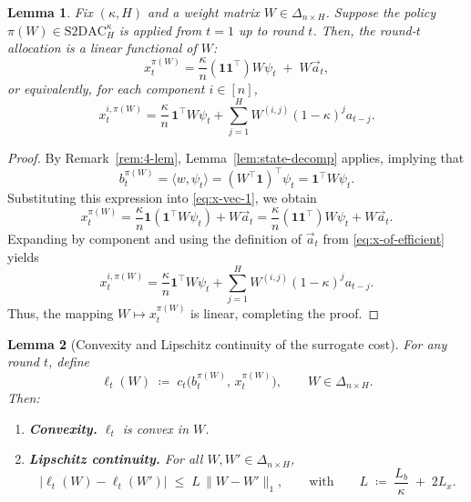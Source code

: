 \documentclass[11pt]{article}
\newtheorem{Thm:Lemma}{Lemma}
\begin{document}
\begin{Thm:Lemma}\label{lem:prefix-linear-x}
Fix \((\kappa, H)\) and a weight matrix \( W \in \Delta_{n \times H} \).  
Suppose the policy \( \pi(W) \in \mathrm{S2DAC}_H^\kappa \) is applied from \( t = 1 \) up to round \( t \).  
Then, the round-\(t\) allocation is a linear functional of \( W \):
\[
x_t^{\pi(W)} 
=
\frac{\kappa}{n} (\mathbf{1}\mathbf{1}^\top) W \psi_t 
\;+\;
W \vec{a}_t,
\]
or equivalently, for each component \( i \in [n] \),
\[
x_t^{i,\pi(W)} 
=
\frac{\kappa}{n}\,
\mathbf{1}^\top W \psi_t
+
\sum_{j=1}^H W^{(i,j)} (1-\kappa)^j a_{t-j}.
\]
\end{Thm:Lemma}

\begin{proof}
By Remark~\ref{rem:4-lem}, Lemma~\ref{lem:state-decomp} applies, implying that
\[
b_t^{\pi(W)}
= \langle w, \psi_t \rangle
= (W^\top \mathbf{1})^\top \psi_t
= \mathbf{1}^\top W \psi_t.
\]
Substituting this expression into \eqref{eq:x-vec-1}, we obtain
\[
x_t^{\pi(W)} 
= \frac{\kappa}{n} \mathbf{1} (\mathbf{1}^\top W \psi_t) + W \vec{a}_t
= \frac{\kappa}{n} (\mathbf{1}\mathbf{1}^\top) W \psi_t + W \vec{a}_t.
\]
Expanding by component and using the definition of \(\vec{a}_t\) from \eqref{eq:x-of-efficient} yields
\[
x_t^{i,\pi(W)}
= \frac{\kappa}{n} \mathbf{1}^\top W \psi_t
+ \sum_{j=1}^H W^{(i,j)} (1-\kappa)^j a_{t-j}.
\]
Thus, the mapping \( W \mapsto x_t^{\pi(W)} \) is linear, completing the proof.
\end{proof}


\begin{Thm:Lemma}[Convexity and Lipschitz continuity of the surrogate cost]
\label{lem:surrogate-props-W}
For any round \(t\), define
\[
\ell_t(W) \;\coloneqq\; 
c_t\!\bigl(b_t^{\pi(W)},\,x_t^{\pi(W)}\bigr), \qquad W\in\Delta_{n\times H}.
\]
Then:
\begin{enumerate}
    \item \textbf{Convexity.} \(\ell_t\) is convex in \(W\).
    \item \textbf{Lipschitz continuity.} For all \(W,W'\in\Delta_{n\times H}\),
    \[
    \bigl|\ell_t(W)-\ell_t(W')\bigr| \;\le\; L\,\|W-W'\|_1,
    \qquad\text{with}\qquad
    L \;\coloneqq\; \frac{L_b}{\kappa} \;+\; 2L_x.
    \]
\end{enumerate}
\end{Thm:Lemma}
\end{document}

